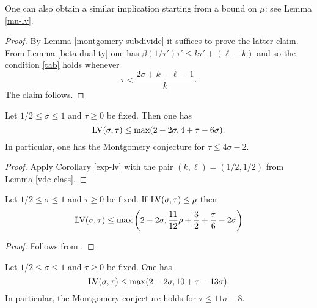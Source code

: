 One can also obtain a similar implication starting from a bound on $\mu$: see Lemma \ref{mu-lv}.

\begin{proof}  By Lemma \ref{montgomery-subdivide} it suffices to prove the latter claim.  From Lemma \ref{beta-duality} one has
    $\beta(1/\tau') \tau' \leq k \tau' + (\ell-k)$
and so the condition \eqref{tab} holds whenever
$$ \tau < \frac{2\sigma+k-\ell-1}{k}.$$
The claim follows.
\end{proof}

\begin{theorem}\label{huxley-lv}\cite[Equation~(2.9)]{Huxley} Let $1/2 \leq \sigma \leq 1$ and $\tau \geq 0$ be fixed.  Then one has
    $$ \mathrm{LV}(\sigma,\tau) \leq \max( 2-2\sigma, 4 + \tau - 6 \sigma).$$
    In particular, one has the Montgomery conjecture for $\tau \leq 4 \sigma - 2$.
\end{theorem}

\literature
{}

\begin{proof}  Apply Corollary \ref{exp-lv} with the pair $(k,\ell) = (1/2,1/2)$ from Lemma \ref{vdc-class}.
\end{proof}


\begin{theorem}\label{heath_brown-lv-prelim} Let $1/2 \leq \sigma \leq 1$ and $\tau \geq 0$ be fixed.  If $\mathrm{LV}(\sigma, \tau) \le \rho$ then
    \[
    \mathrm{LV}(\sigma, \tau) \le \max\left(2 - 2\sigma, \frac{11}{12}\rho + \frac{3}{2} + \frac{\tau}{6} - 2\sigma\right)
    \]
\end{theorem}

\begin{proof}
    Follows from \cite[Lemma~1]{heathbrown_zero_1979}.
\end{proof}

\begin{theorem}\label{hb-opt} Let $1/2 \leq \sigma \leq 1$ and $\tau \geq 0$ be fixed.   One has
    $$ \mathrm{LV}(\sigma,\tau) \leq \max( 2-2\sigma, 10 + \tau - 13 \sigma).$$
In particular, the Montgomery conjecture holds for $\tau \leq 11 \sigma - 8$.
\end{theorem}


\literature
{}

